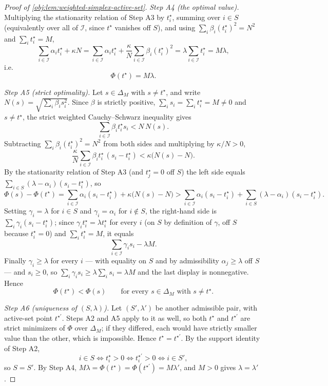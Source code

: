 \begin{proof}[Proof of \cref{obj:lem:weighted-simplex-active-set}]
\emph{Step A4 (the optimal value).}  Multiplying the stationarity relation of Step A3 by \(t_i^\star\), summing over \(i\in S\) (equivalently over all of \(\mathcal I\), since \(t^\star\) vanishes off \(S\)), and using \(\sum_i\beta_i(t_i^\star)^2=N^2\) and \(\sum_it_i^\star=M\),
\[
\sum_{i\in\mathcal I}\alpha_it_i^\star+\kappa N
=\sum_{i\in\mathcal I}\alpha_it_i^\star+\frac{\kappa}{N}\sum_{i\in\mathcal I}\beta_i(t_i^\star)^2
=\lambda\sum_{i\in\mathcal I}t_i^\star=M\lambda ,
\]
i.e.
\[
\Phi(t^\star)=M\lambda .
\]

\emph{Step A5 (strict optimality).}  Let \(s\in\Delta_M\) with \(s\ne t^\star\), and write \(N(s)=\sqrt{\sum_i\beta_is_i^2}\).  Since \(\beta\) is strictly positive, \(\sum_is_i=\sum_it_i^\star=M\ne0\) and \(s\ne t^\star\), the strict weighted Cauchy--Schwarz inequality gives
\[
\sum_{i\in\mathcal I}\beta_it_i^\star s_i<N\,N(s).
\]
Subtracting \(\sum_i\beta_i(t_i^\star)^2=N^2\) from both sides and multiplying by \(\kappa/N>0\),
\[
\frac{\kappa}{N}\sum_{i\in\mathcal I}\beta_it_i^\star\,(s_i-t_i^\star)
<\kappa\bigl(N(s)-N\bigr).
\]
By the stationarity relation of Step A3 (and \(t_j^\star=0\) off \(S\)) the left side equals \(\sum_{i\in S}(\lambda-\alpha_i)(s_i-t_i^\star)\), so
\[
\Phi(s)-\Phi(t^\star)
=\sum_{i\in\mathcal I}\alpha_i(s_i-t_i^\star)+\kappa\bigl(N(s)-N\bigr)
>\sum_{i\in\mathcal I}\alpha_i(s_i-t_i^\star)
+\sum_{i\in S}(\lambda-\alpha_i)(s_i-t_i^\star).
\]
Setting \(\gamma_i=\lambda\) for \(i\in S\) and \(\gamma_i=\alpha_i\) for \(i\notin S\), the right-hand side is \(\sum_i\gamma_i(s_i-t_i^\star)\); since \(\gamma_it_i^\star=\lambda t_i^\star\) for every \(i\) (on \(S\) by definition of \(\gamma\), off \(S\) because \(t_i^\star=0\)) and \(\sum_it_i^\star=M\), it equals
\[
\sum_{i\in\mathcal I}\gamma_is_i-\lambda M .
\]
Finally \(\gamma_i\ge\lambda\) for every \(i\) --- with equality on \(S\) and by admissibility \(\alpha_j\ge\lambda\) off \(S\) --- and \(s_i\ge0\), so \(\sum_i\gamma_is_i\ge\lambda\sum_is_i=\lambda M\) and the last display is nonnegative.  Hence
\[
\Phi(t^\star)<\Phi(s)
\qquad\text{for every }s\in\Delta_M\text{ with }s\ne t^\star .
\]

\emph{Step A6 (uniqueness of \((S,\lambda)\)).}  Let \((S',\lambda')\) be another admissible pair, with active-set point \(t^{\star\prime}\).  Steps A2 and A5 apply to it as well, so both \(t^\star\) and \(t^{\star\prime}\) are strict minimizers of \(\Phi\) over \(\Delta_M\); if they differed, each would have strictly smaller value than the other, which is impossible.  Hence \(t^\star=t^{\star\prime}\).  By the support identity of Step A2,
\[
i\in S\iff t_i^\star>0\iff t_i^{\star\prime}>0\iff i\in S',
\]
so \(S=S'\).  By Step A4, \(M\lambda=\Phi(t^\star)=\Phi(t^{\star\prime})=M\lambda'\), and \(M>0\) gives \(\lambda=\lambda'\). %


\end{proof}
